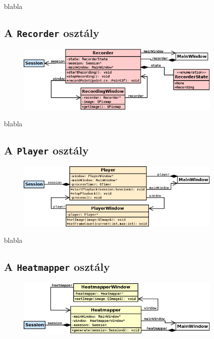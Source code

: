 blabla

\subsection{A \texttt{Recorder} osztály}\label{sect:recorder}

\begin{figure}[!ht]
\centering
\includegraphics[width=100mm, keepaspectratio]{figures/class_recorder.png}
\end{figure}

blabla

\subsection{A \texttt{Player} osztály}\label{sect:player}

\begin{figure}[!ht]
\centering
\includegraphics[width=100mm, keepaspectratio]{figures/class_player.png}
\end{figure}

blabla

\subsection{A \texttt{Heatmapper} osztály}\label{sect:heatmapper}

\begin{figure}[!ht]
\centering
\includegraphics[width=100mm, keepaspectratio]{figures/class_heatmapper.png}
\end{figure}

